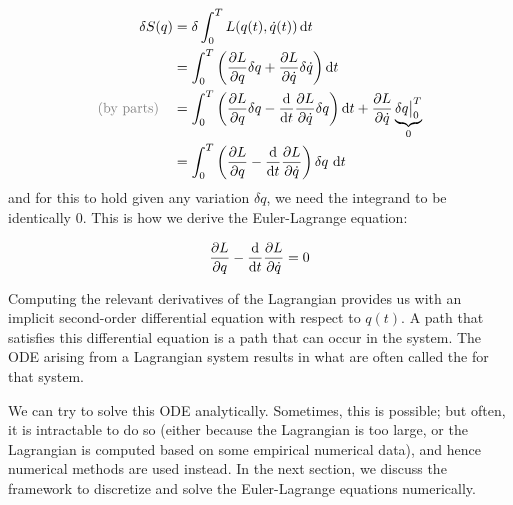 \begin{align}
	\delta S(q)                     & = \delta \int_0^T L(q(t), \dot{q}(t)) \odif{t}                                                                                                     \nonumber           \\
	                                & = \int_0^T \left(\pdv{L}{q} \delta q + \pdv{L}{\dot{q}} \delta \dot{q}\right) \odif{t}                                                             \nonumber           \\
	\text{\faint{(by parts)}} \quad & = \int_0^T \left(\pdv{L}{q} \delta q - \odv{}{t} \pdv{L}{\dot{q}} \delta q \right) \odif{t} + \pdv{L}{\dot{q}} \underbrace{\delta q \big|_0^T}_{0} \label{eq:el-parts} \\
	                                & = \int_0^T \left(\pdv{L}{q} - \odv{}{t} \pdv{L}{\dot{q}} \right) \delta q \, \odif{t}                                                              \nonumber           
\end{align}
and for this to hold given any variation $\delta q$, we need the integrand to be identically $0$. This is how we derive the Euler-Lagrange equation:

\begin{equation}
	\pdv{L}{q} - \odv{}{t} \pdv{L}{\dot{q}} = 0
	\label{eq:euler-lagrange}
\end{equation}

Computing the relevant derivatives of the Lagrangian provides us with an implicit second-order differential equation with respect to $q(t)$. A path that satisfies this differential equation is a path that can occur in the system. The ODE arising from a Lagrangian system results in what are often called the  for that system.


\bigskip

We can try to solve this ODE analytically. Sometimes, this is possible; but often, it is intractable to do so (either because the Lagrangian is too large, or the Lagrangian is computed based on some empirical numerical data), and hence numerical methods are used instead. In the next section, we discuss the framework to discretize and solve the Euler-Lagrange equations numerically.
